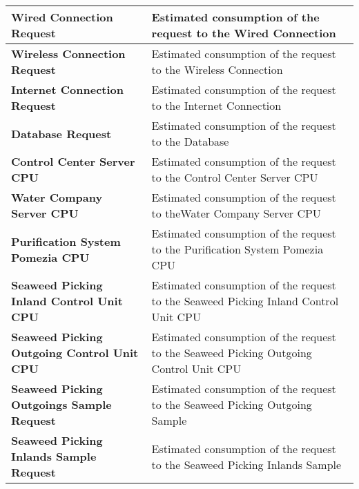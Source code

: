 \begin{longtable}{|p{6cm}|p{9cm}|}

\hline
\textbf{Wired Connection Request} & Estimated consumption of the 											request to the Wired Connection \\

\hline
\textbf{Wireless Connection Request} & Estimated consumption of the 										   request to the Wireless 												   Connection \\

\hline
\textbf{Internet Connection Request} & Estimated consumption of the 										   request to the Internet 												   Connection \\

\hline
\textbf{Database Request} & Estimated consumption of the request to 								the Database \\ 

\hline
\textbf{Control Center Server CPU} & Estimated consumption of the 											 request to the Control Center 											 Server CPU\\

\hline
\textbf{Water Company Server CPU} & Estimated consumption of the 											request to theWater Company Server										CPU\\

\hline
\textbf{Purification System Pomezia CPU} & Estimated consumption of 											   the request to the 													   Purification System Pomezia 										   CPU\\


\hline
\textbf{Seaweed Picking Inland Control Unit CPU} & Estimated 															   consumption of 											   			   the request to the 													   Seaweed Picking 														   Inland Control Unit 												   CPU\\

\hline
\textbf{Seaweed Picking Outgoing Control Unit CPU} & Estimated 															   consumption of 											   			   the request to the 													   Seaweed Picking 														   Outgoing Control 													   Unit CPU\\

\hline
\textbf{Seaweed Picking Outgoings Sample Request} & Estimated 															   consumption of 											   			   the request to the 													   Seaweed Picking 														   Outgoing Sample \\

\hline
\textbf{Seaweed Picking Inlands Sample Request} & Estimated 															  consumption of 											   			  the request to the 													  Seaweed Picking 														  Inlands Sample \\
\hline
\end{longtable}

